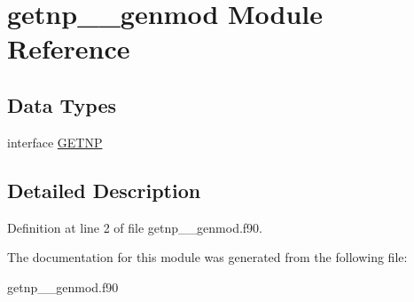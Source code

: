 \hypertarget{classgetnp____genmod}{\section{getnp\+\_\+\+\_\+genmod Module Reference}
\label{classgetnp____genmod}
}
\subsection*{Data Types}
\begin{DoxyCompactItemize}
\item 
interface \hyperlink{interfacegetnp____genmod_1_1_g_e_t_n_p}{G\+E\+T\+N\+P}
\end{DoxyCompactItemize}


\subsection{Detailed Description}


Definition at line 2 of file getnp\+\_\+\+\_\+genmod.\+f90.



The documentation for this module was generated from the following file\+:\begin{DoxyCompactItemize}
\item 
getnp\+\_\+\+\_\+genmod.\+f90\end{DoxyCompactItemize}
